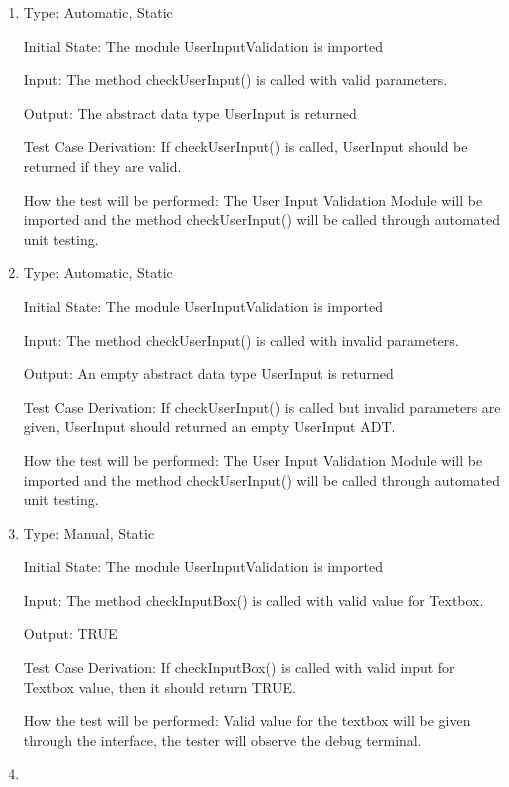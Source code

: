 \documentclass[12pt, titlepage]{article}
\begin{document}
  \begin{enumerate}[{UT-UI}1.]

  \item
  
  Type: Automatic, Static 

  Initial State: The module UserInputValidation is imported

  Input: The method checkUserInput() is called with valid parameters.

  Output: The abstract data type UserInput is returned

  Test Case Derivation: If checkUserInput() is called,  UserInput should be returned if they are valid.

  How the test will be performed: The User Input Validation Module will be imported and the method checkUserInput() will be called through automated unit testing. 

  \item
  
  Type: Automatic, Static 

  Initial State: The module UserInputValidation is imported

  Input: The method checkUserInput() is called with invalid parameters.

  Output: An empty abstract data type UserInput is returned

  Test Case Derivation: If checkUserInput() is called but invalid parameters are given,  UserInput should returned an empty UserInput ADT.

  How the test will be performed: The User Input Validation Module will be imported and the method checkUserInput() will be called through automated unit testing. 

  \item
  
  Type: Manual, Static 

  Initial State: The module UserInputValidation is imported

  Input: The method checkInputBox() is called with valid value for Textbox.

  Output: TRUE

  Test Case Derivation: If checkInputBox() is called with valid  input for Textbox value, then it should return TRUE.

  How the test will be performed: Valid value for the textbox will be given through the interface, the tester will observe the debug terminal.

    \item
  

\end{enumerate}
\end{document}
